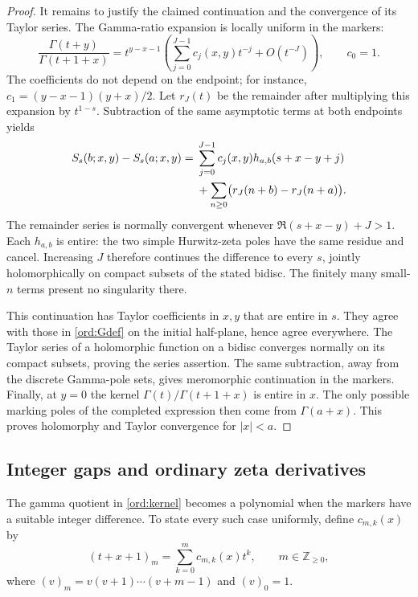 \documentclass[11pt,a4paper]{article}
\numberwithin{equation}{section}
\theoremstyle{definition}
\theoremstyle{remark}
\begin{document}
\begin{proof}
It remains to justify the claimed continuation and the convergence
of its Taylor series.  The Gamma-ratio expansion
\cite[\S5.11(iii)]{DLMF} is locally uniform in the markers:
\[
 \frac{\Gamma(t+y)}{\Gamma(t+1+x)}
  =t^{y-x-1}
    \left(\sum_{j=0}^{J-1}c_j(x,y)t^{-j}+O(t^{-J})\right),
 \qquad c_0=1.
\]
The coefficients do not depend on the endpoint; for instance,
$c_1=(y-x-1)(y+x)/2$.  Let $r_J(t)$ be the remainder after multiplying
this expansion by $t^{1-s}$.  Subtraction of the same asymptotic terms
at both endpoints yields
\begin{align}
 S_s(b;x,y)-S_s(a;x,y)
  ={}&\sum_{j=0}^{J-1}c_j(x,y)h_{a,b}(s+x-y+j)\notag\\
    &+\sum_{n\ge0}\bigl(r_J(n+b)-r_J(n+a)\bigr).
 \label{ord:subtract}
\end{align}
The remainder series is normally convergent whenever
$\Re(s+x-y)+J>1$.  Each $h_{a,b}$ is entire: the two simple Hurwitz-zeta
poles have the same residue and cancel.  Increasing $J$ therefore
continues the difference to every $s$, jointly holomorphically on
compact subsets of the stated bidisc.  The finitely many small-$n$
terms present no singularity there.

This continuation has Taylor coefficients in $x,y$ that are entire in
$s$.  They agree with those in \eqref{ord:Gdef} on the initial
half-plane, hence agree everywhere.  The Taylor series of a holomorphic
function on a bidisc converges normally on its compact subsets, proving
the series assertion.  The same subtraction, away from the discrete
Gamma-pole sets, gives meromorphic continuation in the markers.
Finally, at $y=0$ the kernel
$\Gamma(t)/\Gamma(t+1+x)$ is entire in $x$.  The only possible marking
poles of the completed expression then come from $\Gamma(a+x)$.
This proves holomorphy and Taylor convergence for $|x|<a$.
\end{proof}

\subsection{Integer gaps and ordinary zeta derivatives}

The gamma quotient in \eqref{ord:kernel} becomes a polynomial when
the markers have a suitable integer difference.  To state every such
case uniformly, define $c_{m,k}(x)$ by
\[
          (t+x+1)_m=\sum_{k=0}^m c_{m,k}(x)t^k,
 \qquad m\in\mathbb Z_{\ge0},
\]
where $(v)_m=v(v+1)\cdots(v+m-1)$ and $(v)_0=1$.
\end{document}
